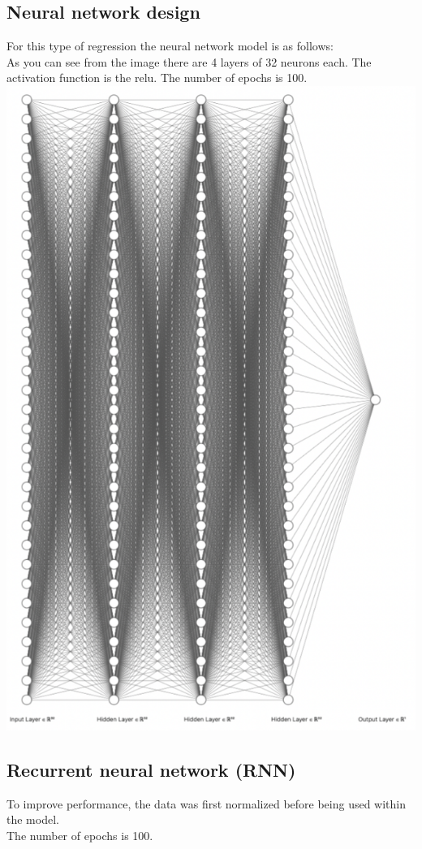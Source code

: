 \subsection{Neural network design}
For this type of regression the neural network model is as follows:
\\As you can see from the image there are 4 layers of 32 neurons each. The activation function is the relu. The number of epochs is 100.
\\\includegraphics[scale = 0.75]{Images/NnStructure.png}
\subsection{Recurrent neural network (RNN)}
To improve performance, the data was first normalized before being used within the model.
\\The number of epochs is 100.

